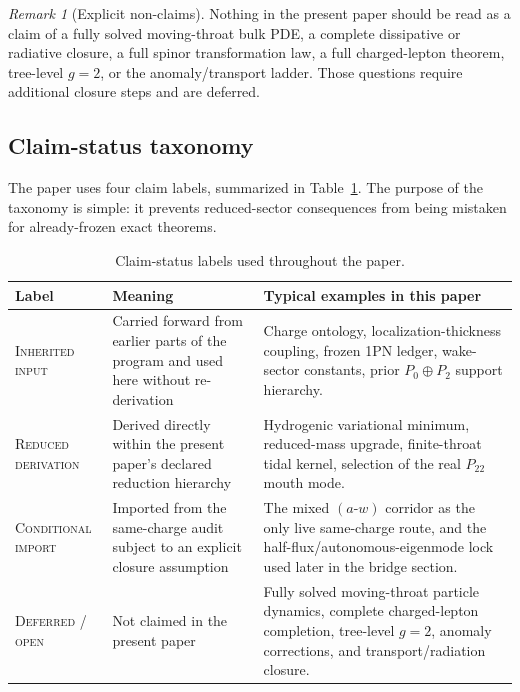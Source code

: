 \documentclass[11pt]{article}
\theoremstyle{plain}
\theoremstyle{definition}
\theoremstyle{remark}
\newtheorem{remark}[theorem]{Remark}
\newcommand{\Ptwotwo}{P_{22}}
\begin{document}
\begin{remark}[Explicit non-claims]
Nothing in the present paper should be read as a claim of a fully solved moving-throat bulk PDE, a complete dissipative or radiative closure, a full spinor transformation law, a full charged-lepton theorem, tree-level $g=2$, or the anomaly/transport ladder. Those questions require additional closure steps and are deferred.
\end{remark}

\subsection{Claim-status taxonomy}\label{subsec:claim-status}

The paper uses four claim labels, summarized in Table~\ref{tab:claim-status}. The purpose of the taxonomy is simple: it prevents reduced-sector consequences from being mistaken for already-frozen exact theorems.

\begin{table}[t]
\centering
\caption{Claim-status labels used throughout the paper.}
\label{tab:claim-status}
\begin{tabularx}{\textwidth}{@{}>{\raggedright\arraybackslash}p{} >{\raggedright\arraybackslash}p{} X@{}}
\toprule
Label & Meaning & Typical examples in this paper \\
\midrule
\textsc{Inherited input} & Carried forward from earlier parts of the program and used here without re-derivation & Charge ontology, localization-thickness coupling, frozen 1PN ledger, wake-sector constants, prior $P_0\oplus P_2$ support hierarchy. \\
\textsc{Reduced derivation} & Derived directly within the present paper's declared reduction hierarchy & Hydrogenic variational minimum, reduced-mass upgrade, finite-throat tidal kernel, selection of the real $\Ptwotwo$ mouth mode. \\
\textsc{Conditional import} & Imported from the same-charge audit subject to an explicit closure assumption & The mixed $(a\text{-}w)$ corridor as the only live same-charge route, and the half-flux/autonomous-eigenmode lock used later in the bridge section. \\
\textsc{Deferred / open} & Not claimed in the present paper & Fully solved moving-throat particle dynamics, complete charged-lepton completion, tree-level $g=2$, anomaly corrections, and transport/radiation closure. \\
\bottomrule
\end{tabularx}
\end{table}
\end{document}
